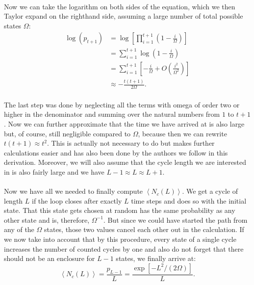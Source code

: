 \paragraph*{}
Now we can take the logarithm on both sides of the equation, which we then Taylor expand on the righthand side, assuming a large number of total possible states $\Omega$:
\begin{equation}
\begin{split}
\log{(p_{t+1})} &= \log{\left[\prod\limits_{i=1}^{t+1} \left(1-\frac{i}{\Omega}\right)\right]}\\
&= \sum\limits_{i=1}^{t+1} \log{\left(1-\frac{i}{\Omega}\right)}\\
&= \sum\limits_{i=1}^{t+1} \left[- \frac{i}{\Omega} + O\left(\frac{i^2}{\Omega^2}\right)\right]\\
&\approx - \frac{t(t+1)}{2\Omega}.
\end{split}
\end{equation}


\paragraph*{}
The last step was done by neglecting all the terms with omega of order two or higher in the denominator and summing over the natural numbers from $1$ to $t+1$. Now we can further approximate that the time we have arrived at is also large but, of course, still negligible compared to $\Omega$, because then we can rewrite $t(t+1)\approx t^2$. This is actually not necessary to do but makes further calculations easier and has also been done by the authors we follow in this derivation. Moreover, we will also assume that the cycle length we are interested in is also fairly large and we have $L-1\approx L \approx L+1$.

\paragraph*{}
Now we have all we needed to finally compute $\left\langle N_c(L) \right\rangle$. We get a cycle of length $L$ if the loop closes after exactly $L$ time steps and does so with the initial state. That this state gets chosen at random has the same probability as any other state and is, therefore, $\Omega^{-1}$. But since we could have started the path from any of the $\Omega$ states, those two values cancel each other out in the calculation. If we now take into account that by this procedure, every state of a single cycle increases the number of counted cycles by one and also do not forget that there should not be an enclosure for $L-1$ states, we finally arrive at:
\begin{equation}\label{eq:number_cycles_chaotic}
\left\langle N_c(L) \right\rangle = \frac{p_{L-1}}{L} = \frac{\exp{\left[-L^2/(2\Omega)\right]}}{L}.
\end{equation}

